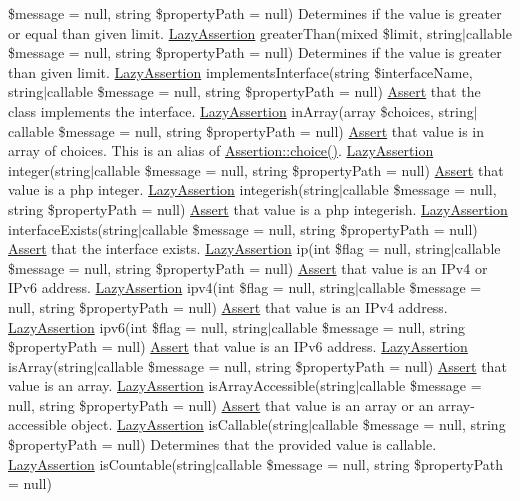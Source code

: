 \$message = null, string \$property\+Path = null) Determines if the value is greater or equal than given limit.  \mbox{\hyperlink{class_assert_1_1_lazy_assertion}{Lazy\+Assertion}} greater\+Than(mixed \$limit, string$\vert$callable \$message = null, string \$property\+Path = null) Determines if the value is greater than given limit.  \mbox{\hyperlink{class_assert_1_1_lazy_assertion}{Lazy\+Assertion}} implements\+Interface(string \$interface\+Name, string$\vert$callable \$message = null, string \$property\+Path = null) \mbox{\hyperlink{class_assert_1_1_assert}{Assert}} that the class implements the interface.  \mbox{\hyperlink{class_assert_1_1_lazy_assertion}{Lazy\+Assertion}} in\+Array(array \$choices, string$\vert$callable \$message = null, string \$property\+Path = null) \mbox{\hyperlink{class_assert_1_1_assert}{Assert}} that value is in array of choices. This is an alias of \mbox{\hyperlink{class_assert_1_1_assertion_a3775923caa193a78aa0bb48a66ee61d0}{Assertion\+::choice()}}.  \mbox{\hyperlink{class_assert_1_1_lazy_assertion}{Lazy\+Assertion}} integer(string$\vert$callable \$message = null, string \$property\+Path = null) \mbox{\hyperlink{class_assert_1_1_assert}{Assert}} that value is a php integer.  \mbox{\hyperlink{class_assert_1_1_lazy_assertion}{Lazy\+Assertion}} integerish(string$\vert$callable \$message = null, string \$property\+Path = null) \mbox{\hyperlink{class_assert_1_1_assert}{Assert}} that value is a php integer\textquotesingle{}ish.  \mbox{\hyperlink{class_assert_1_1_lazy_assertion}{Lazy\+Assertion}} interface\+Exists(string$\vert$callable \$message = null, string \$property\+Path = null) \mbox{\hyperlink{class_assert_1_1_assert}{Assert}} that the interface exists.  \mbox{\hyperlink{class_assert_1_1_lazy_assertion}{Lazy\+Assertion}} ip(int \$flag = null, string$\vert$callable \$message = null, string \$property\+Path = null) \mbox{\hyperlink{class_assert_1_1_assert}{Assert}} that value is an I\+Pv4 or I\+Pv6 address.  \mbox{\hyperlink{class_assert_1_1_lazy_assertion}{Lazy\+Assertion}} ipv4(int \$flag = null, string$\vert$callable \$message = null, string \$property\+Path = null) \mbox{\hyperlink{class_assert_1_1_assert}{Assert}} that value is an I\+Pv4 address.  \mbox{\hyperlink{class_assert_1_1_lazy_assertion}{Lazy\+Assertion}} ipv6(int \$flag = null, string$\vert$callable \$message = null, string \$property\+Path = null) \mbox{\hyperlink{class_assert_1_1_assert}{Assert}} that value is an I\+Pv6 address.  \mbox{\hyperlink{class_assert_1_1_lazy_assertion}{Lazy\+Assertion}} is\+Array(string$\vert$callable \$message = null, string \$property\+Path = null) \mbox{\hyperlink{class_assert_1_1_assert}{Assert}} that value is an array.  \mbox{\hyperlink{class_assert_1_1_lazy_assertion}{Lazy\+Assertion}} is\+Array\+Accessible(string$\vert$callable \$message = null, string \$property\+Path = null) \mbox{\hyperlink{class_assert_1_1_assert}{Assert}} that value is an array or an array-\/accessible object.  \mbox{\hyperlink{class_assert_1_1_lazy_assertion}{Lazy\+Assertion}} is\+Callable(string$\vert$callable \$message = null, string \$property\+Path = null) Determines that the provided value is callable.  \mbox{\hyperlink{class_assert_1_1_lazy_assertion}{Lazy\+Assertion}} is\+Countable(string$\vert$callable \$message = null, string \$property\+Path = null) 